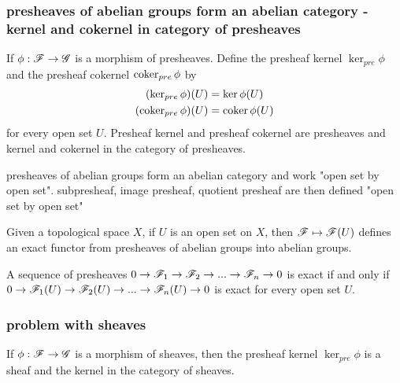 \subsubsection{presheaves of abelian groups form an abelian category - kernel and cokernel in category of presheaves}

\begin{definition}
	If $\phi: \mathscr{F} \to \mathscr{G}$ is a morphism of presheaves. Define the presheaf kernel $\ker_{pre} \phi$ and the presheaf cokernel $\operatorname{coker}_{pre} \phi$ by
	\begin{align*}
		(\ker_{pre} \phi)(U) &= \ker \phi(U) \\
		(\operatorname{coker}_{pre} \phi)(U) &= \operatorname{coker} \phi(U)
	\end{align*}
	for every open set $U$. Presheaf kernel and presheaf cokernel are presheaves and kernel and cokernel in the category of presheaves.
\end{definition}

\begin{remark}
	presheaves of abelian groups form an abelian category and work "open set by open set". subpresheaf, image presheaf, quotient presheaf are then defined "open set by open set"
\end{remark}

\begin{proposition}
	Given a topological space $X$, if $U$ is an open set on $X$, then $\mathscr{F} \mapsto \mathscr{F}(U)$ defines an exact functor from presheaves of abelian groups into abelian groups.
\end{proposition}

\begin{proposition}
	A sequence of presheaves $0 \to \mathscr{F}_1 \to \mathscr{F}_2 \to ... \to \mathscr{F}_n \to 0$ is exact if and only if $0 \to \mathscr{F}_1(U) \to \mathscr{F}_2(U) \to ... \to \mathscr{F}_n(U) \to 0$ is exact for every open set $U$.
\end{proposition}

\subsubsection{problem with sheaves}

\begin{proposition}
	If $\phi: \mathscr{F} \to \mathscr{G}$ is a morphism of sheaves, then the presheaf kernel $\ker_{pre} \phi$ is a sheaf and the kernel in the category of sheaves.
\end{proposition}

